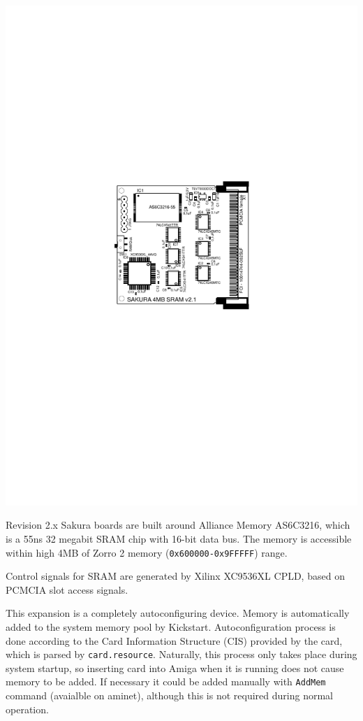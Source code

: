 \documentclass[10pt,a5paper]{article}
\begin{document}
\begin{center}
\includegraphics{board21layout.pdf}
\end{center}

Revision 2.x Sakura boards are built around Alliance Memory AS6C3216, which is a 55ns 32 megabit SRAM chip with 16-bit data bus. The memory is accessible within high 4MB of Zorro 2 memory ({\tt 0x600000-0x9FFFFF}) range.

Control signals for SRAM are generated by Xilinx XC9536XL CPLD, based on PCMCIA slot access signals.

This expansion is a completely autoconfiguring device. Memory is automatically added to the system memory pool by Kickstart. Autoconfiguration process is done according to the Card Information Structure (CIS) provided by the card, which is parsed by {\tt card.resource}. Naturally, this process only takes place during system startup, so inserting card into Amiga when it is running does not cause memory to be added. If necessary it could be added manually with {\tt AddMem} command (avaialble on aminet), although this is not required during normal operation.
\end{document}
